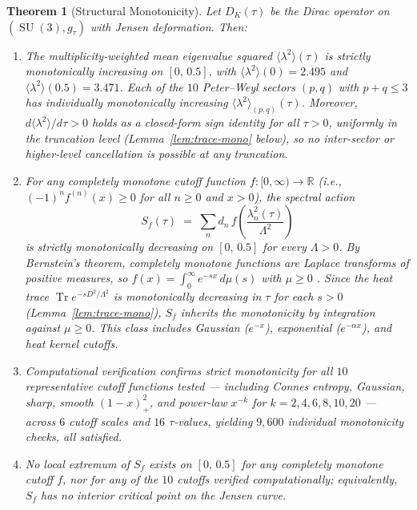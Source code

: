 \documentclass[12pt]{article}
\newtheorem{theorem}{Theorem}
\theoremstyle{definition}
\theoremstyle{remark}
\DeclareMathOperator{\Tr}{Tr}
\DeclareMathOperator{\SU}{SU}
\begin{document}
\begin{theorem}[Structural Monotonicity]\label{thm:structural}
Let $D_K(\tau)$ be the Dirac operator on $(\SU(3), g_\tau)$ with
Jensen deformation.  Then:
\begin{enumerate}
\item[(i)] The multiplicity-weighted mean eigenvalue squared
  $\langle\lambda^2\rangle(\tau)$ is strictly monotonically increasing
  on $[0,\, 0.5]$, with $\langle\lambda^2\rangle(0) = 2.495$ and
  $\langle\lambda^2\rangle(0.5) = 3.471$.  Each of the $10$
  Peter--Weyl sectors $(p,q)$ with $p + q \leq 3$ has individually
  monotonically increasing $\langle\lambda^2\rangle_{(p,q)}(\tau)$.
  Moreover, $d\langle\lambda^2\rangle/d\tau > 0$ holds as a
  closed-form sign identity for all $\tau > 0$, \emph{uniformly in the
  truncation level} (Lemma~\ref{lem:trace-mono} below), so no inter-sector
  or higher-level cancellation is possible at any truncation.

\item[(ii)] For any \emph{completely monotone} cutoff function
  $f : [0,\infty) \to \mathbb{R}$ (i.e., $(-1)^n f^{(n)}(x) \geq 0$
  for all $n \geq 0$ and $x > 0$), the spectral action
  \begin{equation}
    S_f(\tau) \;=\; \sum_n d_n\, f\!\left(
    \frac{\lambda_n^2(\tau)}{\Lambda^2}\right)
  \end{equation}
  is strictly monotonically \emph{decreasing} on $[0,\, 0.5]$ for every
  $\Lambda > 0$.  By Bernstein's theorem, completely monotone functions
  are Laplace transforms of positive measures, so
  $f(x) = \int_0^\infty e^{-sx}\, d\mu(s)$ with $\mu \geq 0$
  \cite{SchillingSongVondracek2012}.  Since the heat trace
  $\Tr e^{-sD^2/\Lambda^2}$ is monotonically decreasing in $\tau$ for
  each $s > 0$ (Lemma~\ref{lem:trace-mono}), $S_f$ inherits the
  monotonicity by integration against $\mu \geq 0$.  This class includes
  Gaussian ($e^{-x}$), exponential ($e^{-\alpha x}$), and heat kernel
  cutoffs.

\item[(iii)] Computational verification confirms strict monotonicity for
  all $10$ representative cutoff functions tested --- including Connes
  entropy, Gaussian, sharp, smooth $(1-x)_+^2$, and power-law
  $x^{-k}$ for $k = 2, 4, 6, 8, 10, 20$ --- across $6$ cutoff
  scales and $16$ $\tau$-values, yielding $9{,}600$ individual
  monotonicity checks, all satisfied.

\item[(iv)] No local extremum of $S_f$ exists on $[0,\, 0.5]$ for any
  completely monotone cutoff $f$, nor for any of the $10$ cutoffs
  verified computationally; equivalently, $S_f$ has no interior
  critical point on the Jensen curve.
\end{enumerate}
\end{theorem}
\end{document}
